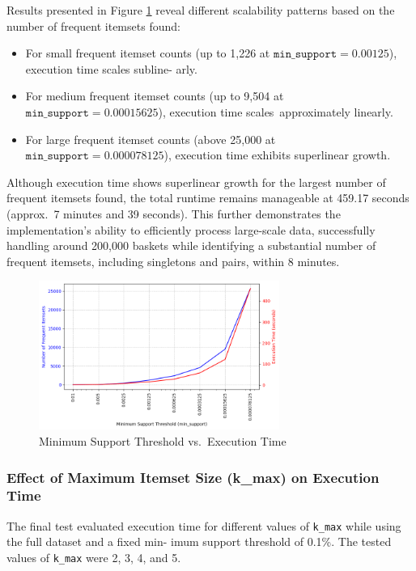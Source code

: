 \documentclass{Class/julia}
\begin{document}
Results presented in Figure \ref{fig:min_support_vs_execution_time} reveal different scalability patterns based on the number of frequent itemsets found:  
\begin{itemize}
    \item For small frequent itemset counts (up to 1,226 at \( \texttt{min\_support} = 0.00125 \)), execution time scales subline- arly.  
    \item For medium frequent itemset counts (up to 9,504 at \( \texttt{min\_support} = 0.00015625 \)), execution time scales~approximately linearly.  
    \item For large frequent itemset counts (above 25,000 at \( \texttt{min\_support} = 0.000078125 \)), execution time exhibits superlinear growth.  
\end{itemize}

Although execution time shows superlinear growth for the largest number of frequent itemsets found, the total runtime remains manageable at 459.17 seconds (approx.\ 7 minutes and 39 seconds). This further demonstrates the implementation's ability to efficiently process large-scale data, successfully handling around 200,000 baskets while identifying a substantial number of frequent itemsets, including singletons and pairs, within 8 minutes.

\begin{figure}[!ht]
    \centering
    \includegraphics[width=0.7\textwidth]{min_support_vs_execution_time.png}
    \caption{Minimum Support Threshold vs.\ Execution Time}
    \label{fig:min_support_vs_execution_time}
\end{figure}

\subsubsection{Effect of Maximum Itemset Size (k\_max) on Execution Time}

The final test evaluated execution time for different values of \texttt{k\_max} while using the full dataset and a fixed min- imum support threshold of 0.1\%. The tested values of \texttt{k\_max} were 2, 3, 4, and 5.  
\end{document}
